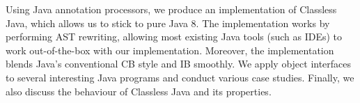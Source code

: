 
%
%
%
%








Using Java annotation processors, we produce an implementation of
Classless Java, which allows us to stick to pure Java 8. 
The implementation works
by performing AST rewriting, allowing most existing Java tools (such as
IDEs) to work out-of-the-box with our implementation. Moreover, the
implementation blends Java's conventional CB style and IB smoothly.
We apply object interfaces to several interesting
Java programs and conduct various case studies. Finally, we also
discuss the behaviour of Classless Java and
its properties.

